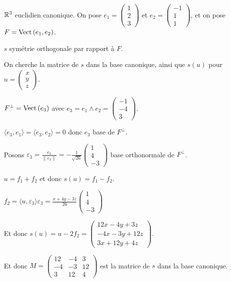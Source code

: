 \begin{exemple}
    $\mathbb{R}^3$ euclidien canonique. 
    On pose $e_1 = \begin{pmatrix}
        1 \\ 2 \\ 3 
    \end{pmatrix}$ et $e_2 = \begin{pmatrix}
        -1 \\ 1 \\ 1
    \end{pmatrix}$, et on pose $F = \operatorname{Vect} \,(e_1, e_2)$.

    $s$ symétrie orthogonale par rapport à $F$. 

    On cherche la matrice de $s$ dans la base canonique, ainsi que $s(u)$ pour $u = \begin{pmatrix}
        x \\ y \\z 
    \end{pmatrix}$.

    \avspace $F^\perp = \operatorname{Vect} \,(e_3)$ avec $e_3 = e_1 \wedge e_2 = \begin{pmatrix}
        -1 \\ -4 \\ 3
    \end{pmatrix}$.

    $\langle e_3, e_1 \rangle = \langle e_3, e_2 \rangle = 0$ donc $e_3$ base de $F^\perp$. 

    Posons $\varepsilon_3 = \frac{e_3}{\|e_3\|} = - \frac 1 {\sqrt {26}} \begin{pmatrix}
        1 \\ 4 \\ -3
    \end{pmatrix}$ base orthonormale de $F^\perp$.

    $u = f_1 + f_2$ et donc $s(u) = f_1 - f_2$.

    $f_2 = \langle u, \varepsilon_3 \rangle \varepsilon_3 = \frac{x + 4y - 3z}{26} \begin{pmatrix}
        1 \\ 4 \\ -3
    \end{pmatrix}$

    Et donc $s(u) = u - 2 f_2 = \begin{pmatrix}
        12x - 4y + 3z \\ -4x - 3 y + 12z \\ 3x + 12y + 4z
    \end{pmatrix}$.

    Et donc $M = \begin{pmatrix}
        12 & -4 & 3 \\
        -4 & -3 & 12 \\
        3 & 12 & 4
    \end{pmatrix}$ est la matrice de $s$ dans la base canonique.
\end{exemple}


